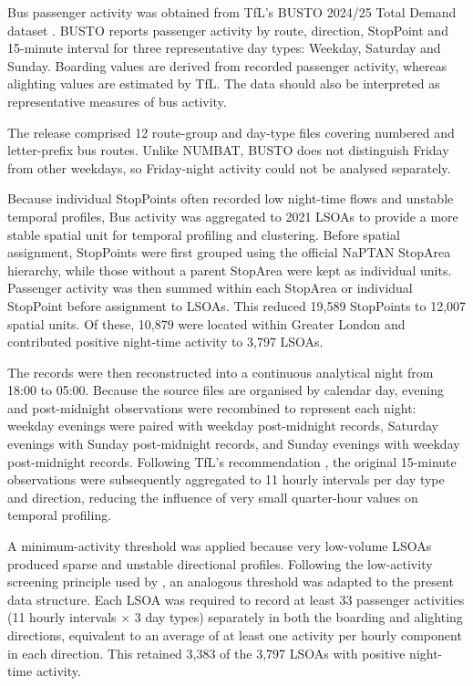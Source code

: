 Bus passenger activity was obtained from TfL's BUSTO 2024/25 Total Demand dataset \citep{TfL2025BUSTO}. BUSTO reports passenger activity by route, direction, StopPoint and 15-minute interval for three representative day types: Weekday, Saturday and Sunday. Boarding values are derived from recorded passenger activity, whereas alighting values are estimated by TfL. The data should also be interpreted as representative measures of bus activity.

The release comprised 12 route-group and day-type files covering numbered and letter-prefix bus routes. Unlike NUMBAT, BUSTO does not distinguish Friday from other weekdays, so Friday-night activity could not be analysed separately.

Because individual StopPoints often recorded low night-time flows and unstable temporal profiles, Bus activity was aggregated to 2021 LSOAs to provide a more stable spatial unit for temporal profiling and clustering. Before spatial assignment, StopPoints were first grouped using the official NaPTAN StopArea hierarchy, while those without a parent StopArea were kept as individual units. Passenger activity was then summed within each StopArea or individual StopPoint before assignment to LSOAs. This reduced 19,589 StopPoints to 12,007 spatial units. Of these, 10,879 were located within Greater London and contributed positive night-time activity to 3,797 LSOAs.

The records were then reconstructed into a continuous analytical night from 18:00 to 05:00. Because the source files are organised by calendar day, evening and post-midnight observations were recombined to represent each night: weekday evenings were paired with weekday post-midnight records, Saturday evenings with Sunday post-midnight records, and Sunday evenings with weekday post-midnight records. Following TfL's recommendation \citep{TfL2025BUSTO}, the original 15-minute observations were subsequently aggregated to 11 hourly intervals per day type and direction, reducing the influence of very small quarter-hour values on temporal profiling.

A minimum-activity threshold was applied because very low-volume LSOAs produced sparse and unstable directional profiles. Following the low-activity screening principle used by \citet{MarinasCollado2022}, an analogous threshold was adapted to the present data structure. Each LSOA was required to record at least 33 passenger activities (11 hourly intervals $\times$ 3 day types) separately in both the boarding and alighting directions, equivalent to an average of at least one activity per hourly component in each direction. This retained 3,383 of the 3,797 LSOAs with positive night-time activity.

